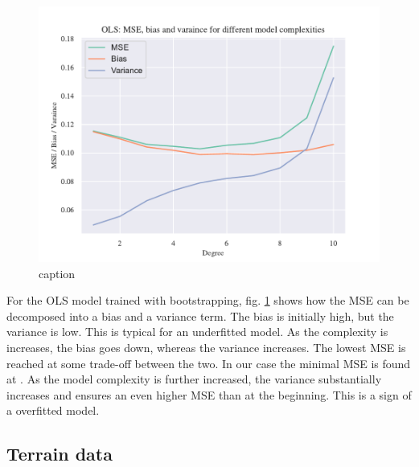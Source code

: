

\begin{figure}[h!]
    \centering
    \includegraphics[width=1\linewidth]{project_1_alt/figures/data/bias_var_Franke_Noise_bootstrap.pdf}
    \caption{caption}
    \label{bias_var_trade}
\end{figure}

For the OLS model trained with bootstrapping, fig. \ref{bias_var_trade} shows how the MSE can be decomposed into a bias and a variance term. The bias is initially high, but the variance is low. This is typical for an underfitted model. As the complexity is increases, the bias goes down, whereas the variance increases. The lowest MSE is reached at some trade-off between the two. In our case the minimal MSE is found at . As the model complexity is further increased, the variance substantially increases and ensures an even higher MSE than at the beginning. This is a sign of a overfitted model.

\subsection{Terrain data}









